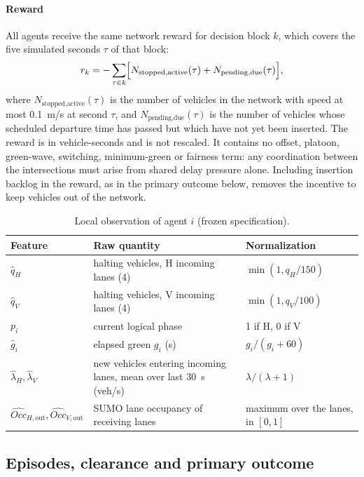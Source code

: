 \documentclass[review,12pt]{elsarticle}
\begin{document}
\paragraph{Reward}
All agents receive the same network reward for decision block $k$,
which covers the five simulated seconds $\tau$ of that block:
\begin{equation}
r_k=-\sum_{\tau\in k}\Bigl[N_{\text{stopped,active}}(\tau)
+N_{\text{pending,due}}(\tau)\Bigr],
\label{eq:reward}
\end{equation}
where $N_{\text{stopped,active}}(\tau)$ is the number of vehicles in the
network with speed at most 0.1~m/s at second $\tau$, and
$N_{\text{pending,due}}(\tau)$ is the number of vehicles whose scheduled
departure time has passed but which have not yet been inserted. The
reward is in vehicle-seconds and is not rescaled. It contains no offset,
platoon, green-wave, switching, minimum-green or fairness term: any
coordination between the intersections must arise from shared delay
pressure alone. Including insertion backlog in the reward, as in the
primary outcome below, removes the incentive to keep vehicles out of
the network.

\begin{table}[!htbp]
\centering
\caption{Local observation of agent $i$ (frozen specification).}
\label{tab:observation}
\small
\begin{tabularx}{\textwidth}{@{}lL{3.8cm}Y@{}}
\toprule
Feature & Raw quantity & Normalization \\
\midrule
$\hat q_H$ & halting vehicles, H incoming lanes (4) & $\min(1,q_H/150)$ \\
$\hat q_V$ & halting vehicles, V incoming lanes (4) & $\min(1,q_V/100)$ \\
$p_i$ & current logical phase & 1 if H, 0 if V \\
$\hat g_i$ & elapsed green $g_i$ (s) & $g_i/(g_i+60)$ \\
$\hat\lambda_H,\hat\lambda_V$ & new vehicles entering incoming lanes, mean over last 30~s (veh/s) & $\lambda/(\lambda+1)$ \\
$\widehat{\mathit{Occ}}_{H,\mathrm{out}},\widehat{\mathit{Occ}}_{V,\mathrm{out}}$ & SUMO lane occupancy of receiving lanes & maximum over the lanes, in $[0,1]$ \\
\bottomrule
\end{tabularx}
\end{table}

\subsection{Episodes, clearance and primary outcome}
\label{subsec:outcome}
\end{document}
